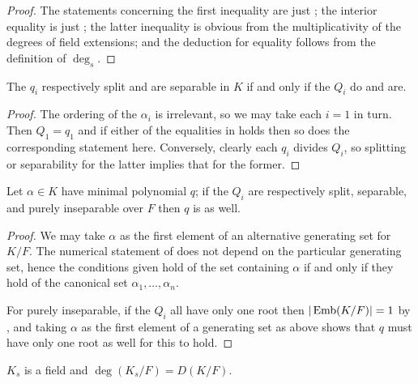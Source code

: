 \begin{proof} The statements concerning the first inequality are just
; the interior equality is just ; the latter
inequality is obvious from the multiplicativity of the degrees of field
extensions; and the deduction for equality follows from the definition of
$\deg_s$. \end{proof}

\begin{corollary} The $q_i$ respectively split and are separable in $K$ if and only
if the $Q_i$ do and are.
\label{absolute_sepsplit}
\end{corollary}

\begin{proof} The ordering of the $\alpha_i$ is irrelevant, so we may take
each $i = 1$ in turn.  Then $Q_1 = q_1$ and if either of the equalities in
 holds then so does the corresponding statement here.
Conversely, clearly each $q_i$ divides $Q_i$, so splitting or separability
for the latter implies that for the former. \end{proof}

\begin{corollary} Let $\alpha \in K$ have minimal polynomial $q$; if the $Q_i$ are
respectively split, separable, and purely inseparable over $F$ then $q$ is as
well.
\label{global_sepsplit}
\end{corollary}

\begin{proof} We may take $\alpha$ as the first element of an alternative
generating set for $K/F$.  The numerical statement of 
does not depend on the particular generating set, hence the conditions given
hold of the set containing $\alpha$ if and only if they hold of the canonical
set ${\alpha_1, \dots, \alpha_n}$.

For purely inseparable, if the $Q_i$ all have only one root then $|\operatorname{\text{Emb}}(K/F)|
= 1$ by , and taking $\alpha$ as the first element of a
generating set as above shows that $q$ must have only one root as well for
this to hold. \end{proof}

\begin{corollary} $K_s$ is a field and $\deg(K_s/F) = D(K/F)$.
\label{sep_subfield}
\end{corollary}

